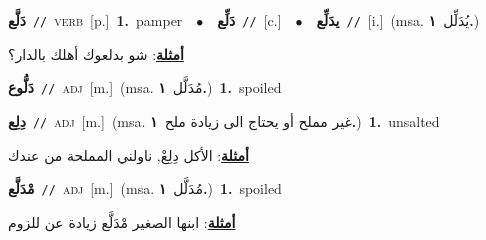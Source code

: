 \documentclass[10pt,a4paper,twoside]{article} %
\begin{document}
\begin{multicols}{2}
{\setlength\topsep{0pt}\textbf{\foreignlanguage{arabic}{دَلَّع}}\ {\color{gray}\texttt{//}\color{black}}\ \textsc{verb}\ [p.]\ \textbf{1.}~pamper\ \ $\bullet$\ \ \setlength\topsep{0pt}\textbf{\foreignlanguage{arabic}{دَلِّع}}\ {\color{gray}\texttt{//}\color{black}}\ [c.]\ \ $\bullet$\ \ \setlength\topsep{0pt}\textbf{\foreignlanguage{arabic}{يدَلِّع}}\ {\color{gray}\texttt{//}\color{black}}\ [i.]\ \color{gray}(msa. \foreignlanguage{arabic}{يُدَلِّل}~\foreignlanguage{arabic}{\textbf{١.}})\color{black}\  \begin{flushright}\color{gray}\foreignlanguage{arabic}{\textbf{\underline{\foreignlanguage{arabic}{أمثلة}}}: شو بدلعوك أهلك بالدار؟}\end{flushright}\color{black}} \vspace{2mm}

{\setlength\topsep{0pt}\textbf{\foreignlanguage{arabic}{دَلُّوع}}\ {\color{gray}\texttt{//}\color{black}}\ \textsc{adj}\ [m.]\ \color{gray}(msa. \foreignlanguage{arabic}{مُدَلَّل}~\foreignlanguage{arabic}{\textbf{١.}})\color{black}\ \textbf{1.}~spoiled\ } \vspace{2mm}

{\setlength\topsep{0pt}\textbf{\foreignlanguage{arabic}{دِلِع}}\ {\color{gray}\texttt{//}\color{black}}\ \textsc{adj}\ [m.]\ \color{gray}(msa. \foreignlanguage{arabic}{غير مملح أو يحتاج الى زيادة ملح}~\foreignlanguage{arabic}{\textbf{١.}})\color{black}\ \textbf{1.}~unsalted\  \begin{flushright}\color{gray}\foreignlanguage{arabic}{\textbf{\underline{\foreignlanguage{arabic}{أمثلة}}}: الأكل دِلِعْ, ناولني المملحة من عندك}\end{flushright}\color{black}} \vspace{2mm}

{\setlength\topsep{0pt}\textbf{\foreignlanguage{arabic}{مْدَلَّع}}\ {\color{gray}\texttt{//}\color{black}}\ \textsc{adj}\ [m.]\ \color{gray}(msa. \foreignlanguage{arabic}{مُدَلَّل}~\foreignlanguage{arabic}{\textbf{١.}})\color{black}\ \textbf{1.}~spoiled\  \begin{flushright}\color{gray}\foreignlanguage{arabic}{\textbf{\underline{\foreignlanguage{arabic}{أمثلة}}}: ابنها الصغير مْدَلَّع زيادة عن للزوم}\end{flushright}\color{black}} \vspace{2mm}


\end{multicols}
\end{document}
